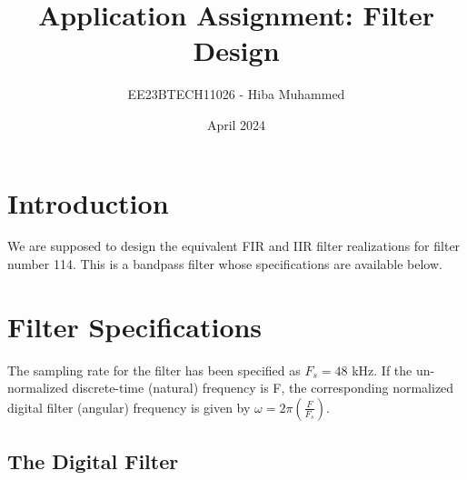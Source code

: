 \documentclass{article}
\title{Application Assignment: Filter Design}
\author{EE23BTECH11026 - Hiba Muhammed}
\date{April 2024}
\begin{document}
\maketitle

\section{Introduction}
We are supposed to design the equivalent FIR and IIR filter realizations for filter number 114.  
This is a bandpass filter whose specifications are available below.
\section{Filter Specifications}
The sampling rate for the filter has been specified as $F_s =  48$ kHz.	If the un-normalized  discrete-time (natural) frequency is F, the corresponding normalized digital filter (angular) frequency is given by $\omega = 2\pi
\left(\frac{F}{F_s}\right)$.
\subsection{The Digital Filter}
\end{document}
